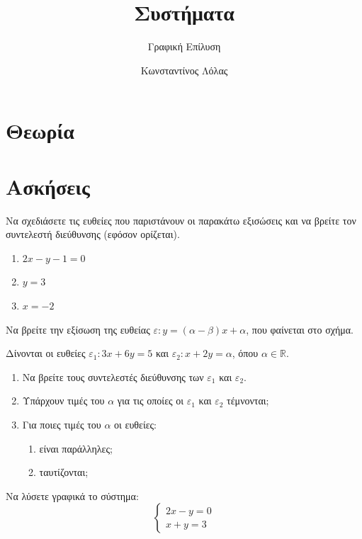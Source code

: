 \documentclass{presentation}
\title{Συστήματα}
\subtitle{Γραφική Επίλυση}
\author[Λόλας]{Κωνσταντίνος Λόλας}
\begin{document}
\begin{frame}
  \titlepage
\end{frame}

\section{Θεωρία}
\begin{frame}
\end{frame}

\section{Ασκήσεις}
\exercises

\begin{askisi}
  Να σχεδιάσετε τις ευθείες που παριστάνουν οι παρακάτω εξισώσεις και να βρείτε τον συντελεστή διεύθυνσης (εφόσον ορίζεται).
  \begin{enumerate}[<+->]
    \item $2x-y-1=0$
    \item $y=3$
    \item $x=-2$
  \end{enumerate}
\end{askisi}

\begin{askisi}
  Να βρείτε την εξίσωση της ευθείας $ε:y=(α-β)x+α$, που φαίνεται στο σχήμα.
\end{askisi}

\begin{askisi}
  Δίνονται οι ευθείες $ε_1:3x+6y=5$ και $ε_2:x+2y=α$, όπου $α\in\mathbb{R}$.
  \begin{enumerate}[<+->]
    \item Να βρείτε τους συντελεστές διεύθυνσης των $ε_1$ και $ε_2$.
    \item Υπάρχουν τιμές του $α$ για τις οποίες οι $ε_1$ και $ε_2$ τέμνονται;
    \item Για ποιες τιμές του $α$ οι ευθείες:
          \begin{enumerate}
            \item είναι παράλληλες;
            \item ταυτίζονται;
          \end{enumerate}
  \end{enumerate}
\end{askisi}

\begin{askisi}
  Να λύσετε γραφικά το σύστημα: $$\begin{cases} 2x-y=0 \\ x+y=3 \end{cases}$$
\end{askisi}
\end{document}
